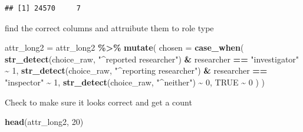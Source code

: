 \documentclass[
]{article}
\newenvironment{Shaded}{\begin{snugshade}}{\end{snugshade}}
\newcommand{\AttributeTok}[1]{\textcolor[rgb]{0.13,0.29,0.53}{#1}}
\newcommand{\ConstantTok}[1]{\textcolor[rgb]{0.56,0.35,0.01}{#1}}
\newcommand{\DecValTok}[1]{\textcolor[rgb]{0.00,0.00,0.81}{#1}}
\newcommand{\FunctionTok}[1]{\textcolor[rgb]{0.13,0.29,0.53}{\textbf{#1}}}
\newcommand{\NormalTok}[1]{#1}
\newcommand{\OtherTok}[1]{\textcolor[rgb]{0.56,0.35,0.01}{#1}}
\newcommand{\SpecialCharTok}[1]{\textcolor[rgb]{0.81,0.36,0.00}{\textbf{#1}}}
\newcommand{\StringTok}[1]{\textcolor[rgb]{0.31,0.60,0.02}{#1}}
\begin{document}
\begin{verbatim}
## [1] 24570     7
\end{verbatim}

find the correct columns and attruibute them to role type

\begin{Shaded}
\begin{Highlighting}[]
\NormalTok{attr\_long2 }\OtherTok{=}\NormalTok{ attr\_long2 }\SpecialCharTok{\%\textgreater{}\%}
  \FunctionTok{mutate}\NormalTok{(}
    \AttributeTok{chosen =} \FunctionTok{case\_when}\NormalTok{(}
      \FunctionTok{str\_detect}\NormalTok{(choice\_raw, }\StringTok{"\^{}reported researcher"}\NormalTok{) }\SpecialCharTok{\&}\NormalTok{ researcher }\SpecialCharTok{==} \StringTok{"investigator"} \SpecialCharTok{\textasciitilde{}} \DecValTok{1}\NormalTok{,}
      \FunctionTok{str\_detect}\NormalTok{(choice\_raw, }\StringTok{"\^{}reporting researcher"}\NormalTok{) }\SpecialCharTok{\&}\NormalTok{ researcher }\SpecialCharTok{==} \StringTok{"inspector"} \SpecialCharTok{\textasciitilde{}} \DecValTok{1}\NormalTok{,}
      \FunctionTok{str\_detect}\NormalTok{(choice\_raw, }\StringTok{"\^{}neither"}\NormalTok{) }\SpecialCharTok{\textasciitilde{}} \DecValTok{0}\NormalTok{,}
      \ConstantTok{TRUE} \SpecialCharTok{\textasciitilde{}} \DecValTok{0}
\NormalTok{    )}
\NormalTok{  )}
\end{Highlighting}
\end{Shaded}

Check to make sure it looks correct and get a count

\begin{Shaded}
\begin{Highlighting}[]
\FunctionTok{head}\NormalTok{(attr\_long2, }\DecValTok{20}\NormalTok{)}
\end{Highlighting}
\end{Shaded}
\end{document}
